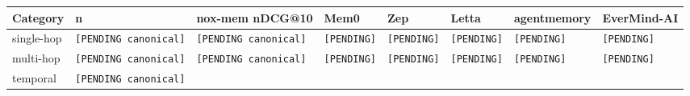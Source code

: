 \documentclass[
]{article}
\newcounter{none} %
\begin{document}
{\def\LTcaptype{none} %
\begin{longtable}[]{@{}
  >{\raggedright\arraybackslash}p{}
  >{\raggedleft\arraybackslash}p{}
  >{\raggedleft\arraybackslash}p{}
  >{\raggedleft\arraybackslash}p{}
  >{\raggedleft\arraybackslash}p{}
  >{\raggedleft\arraybackslash}p{}
  >{\raggedleft\arraybackslash}p{}
  >{\raggedleft\arraybackslash}p{}@{}}
\toprule\noalign{}
\begin{minipage}[b]{\linewidth}\raggedright
Category
\end{minipage} & \begin{minipage}[b]{\linewidth}\raggedleft
n
\end{minipage} & \begin{minipage}[b]{\linewidth}\raggedleft
nox-mem nDCG@10
\end{minipage} & \begin{minipage}[b]{\linewidth}\raggedleft
Mem0
\end{minipage} & \begin{minipage}[b]{\linewidth}\raggedleft
Zep
\end{minipage} & \begin{minipage}[b]{\linewidth}\raggedleft
Letta
\end{minipage} & \begin{minipage}[b]{\linewidth}\raggedleft
agentmemory
\end{minipage} & \begin{minipage}[b]{\linewidth}\raggedleft
EverMind-AI
\end{minipage} \\
\midrule\noalign{}
\endhead
\bottomrule\noalign{}
\endlastfoot
single-hop & \texttt{{[}PENDING\ canonical{]}} &
\texttt{{[}PENDING\ canonical{]}} & \texttt{{[}PENDING{]}} &
\texttt{{[}PENDING{]}} & \texttt{{[}PENDING{]}} & \texttt{{[}PENDING{]}}
& \texttt{{[}PENDING{]}} \\
multi-hop & \texttt{{[}PENDING\ canonical{]}} &
\texttt{{[}PENDING\ canonical{]}} & \texttt{{[}PENDING{]}} &
\texttt{{[}PENDING{]}} & \texttt{{[}PENDING{]}} & \texttt{{[}PENDING{]}}
& \texttt{{[}PENDING{]}} \\
temporal & \texttt{{[}PENDING\ canonical{]}} &

\end{longtable}}
\end{document}
